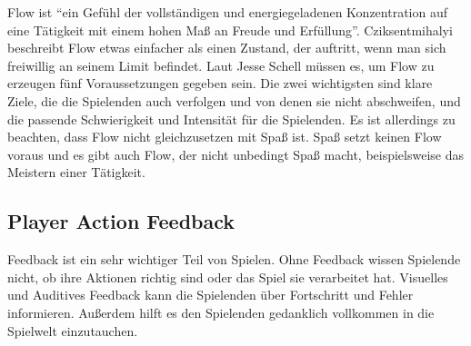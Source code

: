 Flow ist "`ein Gefühl der vollständigen und energiegeladenen Konzentration auf eine Tätigkeit mit einem hohen Maß an Freude und Erfüllung"'\cite[S.204]{_art_of_gamedesign}.
Cziksentmihalyi beschreibt Flow etwas einfacher als einen Zustand, der auftritt, wenn man sich freiwillig an seinem Limit befindet\cite{_flow}.
Laut Jesse Schell müssen es, um Flow zu erzeugen fünf Voraussetzungen gegeben sein\cite[S.211]{_art_of_gamedesign}. Die zwei wichtigsten sind klare Ziele, die die Spielenden auch verfolgen und von denen sie nicht abschweifen, und die passende Schwierigkeit und Intensität für die Spielenden. Es ist allerdings zu beachten, dass Flow nicht gleichzusetzen mit Spaß ist. Spaß setzt keinen Flow voraus und es gibt auch Flow, der nicht unbedingt Spaß macht, beispielsweise das Meistern einer Tätigkeit\cite[S.75]{_theory_of_fun}.

\subsection{Player Action Feedback\label{_feedback}}

Feedback ist ein sehr wichtiger Teil von Spielen. Ohne Feedback wissen Spielende nicht, ob ihre Aktionen richtig sind oder das Spiel sie verarbeitet hat. Visuelles und Auditives Feedback kann die Spielenden über Fortschritt und Fehler informieren. Außerdem hilft es den Spielenden gedanklich vollkommen in die Spielwelt einzutauchen.